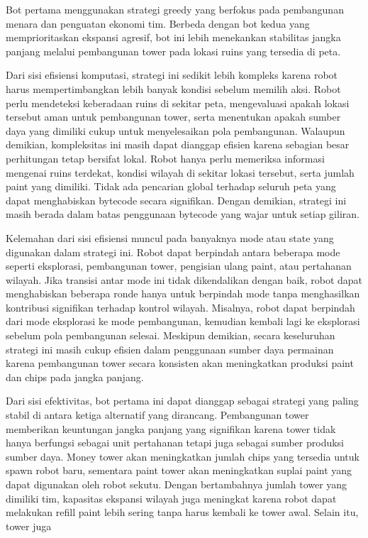 \documentclass{article}
\begin{document}
Bot pertama menggunakan strategi greedy yang berfokus pada pembangunan menara dan penguatan ekonomi tim. Berbeda dengan bot kedua yang memprioritaskan ekspansi agresif, bot ini lebih
menekankan stabilitas jangka panjang melalui pembangunan tower pada lokasi ruins yang tersedia di
peta.

Dari sisi efisiensi komputasi, strategi ini sedikit lebih kompleks karena robot harus mempertimbangkan
lebih banyak kondisi sebelum memilih aksi. Robot perlu mendeteksi keberadaan ruins di sekitar peta, 
mengevaluasi apakah lokasi tersebut aman untuk pembangunan tower, serta menentukan apakah sumber 
daya yang dimiliki cukup untuk menyelesaikan pola pembangunan. Walaupun demikian, kompleksitas ini 
masih dapat dianggap efisien karena sebagian besar perhitungan tetap bersifat lokal. Robot hanya perlu 
memeriksa informasi mengenai ruins terdekat, kondisi wilayah di sekitar lokasi tersebut, serta jumlah 
paint yang dimiliki. Tidak ada pencarian global terhadap seluruh peta yang dapat menghabiskan bytecode 
secara signifikan. Dengan demikian, strategi ini masih berada dalam batas penggunaan bytecode yang 
wajar untuk setiap giliran.

Kelemahan dari sisi efisiensi muncul pada banyaknya mode atau state yang digunakan dalam strategi ini. 
Robot dapat berpindah antara beberapa mode seperti eksplorasi, pembangunan tower, pengisian ulang 
paint, atau pertahanan wilayah. Jika transisi antar mode ini tidak dikendalikan dengan baik, robot dapat 
menghabiskan beberapa ronde hanya untuk berpindah mode tanpa menghasilkan kontribusi signifikan 
terhadap kontrol wilayah. Misalnya, robot dapat berpindah dari mode eksplorasi ke mode pembangunan, 
kemudian kembali lagi ke eksplorasi sebelum pola pembangunan selesai. Meskipun demikian, secara 
keseluruhan strategi ini masih cukup efisien dalam penggunaan sumber daya permainan karena 
pembangunan tower secara konsisten akan meningkatkan produksi paint dan chips pada jangka panjang.

Dari sisi efektivitas, bot pertama ini dapat dianggap sebagai strategi yang paling stabil di antara ketiga 
alternatif yang dirancang. Pembangunan tower memberikan keuntungan jangka panjang yang signifikan 
karena tower tidak hanya berfungsi sebagai unit pertahanan tetapi juga sebagai sumber produksi sumber 
daya. Money tower akan meningkatkan jumlah chips yang tersedia untuk spawn robot baru, sementara 
paint tower akan meningkatkan suplai paint yang dapat digunakan oleh robot sekutu. Dengan 
bertambahnya jumlah tower yang dimiliki tim, kapasitas ekspansi wilayah juga meningkat karena robot 
dapat melakukan refill paint lebih sering tanpa harus kembali ke tower awal. Selain itu, tower juga 
\end{document}

